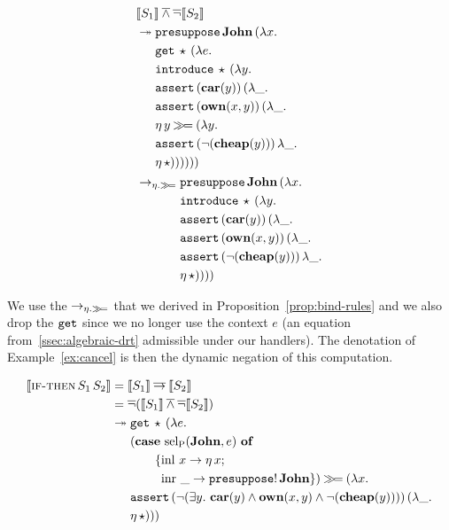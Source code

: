 \begin{align*}
  &\llbracket S_1 \rrbracket \mathbin{\overline{\land}} \mathop{\overline{\lnot}} \llbracket S_2 \rrbracket \\
  &\twoheadrightarrow \begin{aligned}[t]
      &\mathtt{presuppose}\,\textbf{John}\,(\lambda x.\,  \\
      &\mathtt{get}\,\star\,(\lambda e.\,  \\
      &\mathtt{introduce}\,\star\,(\lambda y.\,  \\
      &\mathtt{assert}\,(\textbf{car}(y))\,(\lambda \_.\,  \\
      &\mathtt{assert}\,(\textbf{own}(x, y))\,(\lambda \_.\,  \\
      &\eta\,y \mathbin{\gg\!=} (\lambda y.\,  \\
      &\mathtt{assert}\,(\lnot (\textbf{cheap}(y)))\,\lambda \_.\,  \\
      &\eta\,\star))))))
    \end{aligned} \\
  &\to_{\eta.\mathbin{\gg\!=}} \begin{aligned}[t]
      &\mathtt{presuppose}\,\textbf{John}\,(\lambda x.\,  \\
      &\mathtt{introduce}\,\star\,(\lambda y.\,  \\
      &\mathtt{assert}\,(\textbf{car}(y))\,(\lambda \_.\,  \\
      &\mathtt{assert}\,(\textbf{own}(x, y))\,(\lambda \_.\,  \\
      &\mathtt{assert}\,(\lnot (\textbf{cheap}(y)))\,\lambda \_.\,  \\
      &\eta\,\star))))
    \end{aligned}
\end{align*}

We use the $\to_{\eta.\mathbin{\gg\!=}}$ that we derived in
Proposition~\ref{prop:bind-rules} and we also drop the $\mathtt{get}$ since we
no longer use the context $e$ (an equation from~\ref{ssec:algebraic-drt}
admissible under our handlers). The denotation of Example~\ref{ex:cancel}
is then the dynamic negation of this computation.

\begin{align*}
  \llbracket \textsc{if-then}\,S_1\,S_2 \rrbracket
  &= \llbracket S_1 \rrbracket \mathbin{\overline{\to}} \llbracket S_2 \rrbracket \\
  &= \mathop{\overline{\lnot}} (\llbracket S_1 \rrbracket \mathbin{\overline{\land}} \mathop{\overline{\lnot}} \llbracket S_2 \rrbracket) \\
  &\twoheadrightarrow \begin{aligned}[t]
    &\mathtt{get}\,\star\,(\lambda e.\,  \\
    &(\text{\textbf{case} $\operatorname{sel_P}(\textbf{John}, e)$ \textbf{of}} \\ &\qquad \{\operatorname{inl}\,x \to \eta\,x; \\ &\qquad \ \operatorname{inr}\,\_ \to \mathtt{presuppose}!\,\textbf{John} \}) \mathbin{\gg\!=} (\lambda x.\,  \\
    &\mathtt{assert}\,(\lnot (\exists y.\ \textbf{car}(y) \land \textbf{own}(x, y) \land \lnot (\textbf{cheap}(y))))\,(\lambda \_.\,  \\
    &\eta\,\star)))
    \end{aligned}
\end{align*}

